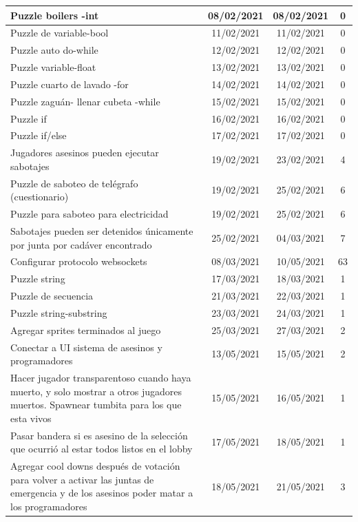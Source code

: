 \begin{longtable}[c]{|m{5cm}|c|c|c|}
        Puzzle boilers -int & 08/02/2021 & 08/02/2021 & 0 \\ \hline
        Puzzle de variable-bool & 11/02/2021 & 11/02/2021 & 0 \\ \hline
        Puzzle auto do-while & 12/02/2021 & 12/02/2021 & 0 \\ \hline
        Puzzle variable-float & 13/02/2021 & 13/02/2021 & 0 \\ \hline
        Puzzle cuarto de lavado -for & 14/02/2021 & 14/02/2021 & 0 \\ \hline
        Puzzle zaguán- llenar cubeta -while & 15/02/2021 & 15/02/2021 & 0 \\ \hline
        Puzzle if & 16/02/2021 & 16/02/2021 & 0 \\ \hline
        Puzzle if/else & 17/02/2021 & 17/02/2021 & 0 \\ \hline
        Jugadores asesinos pueden ejecutar sabotajes & 19/02/2021 & 23/02/2021 & 4 \\ \hline
        Puzzle de saboteo de telégrafo (cuestionario) & 19/02/2021 & 25/02/2021 & 6 \\ \hline
        Puzzle para saboteo para electricidad & 19/02/2021 & 25/02/2021 & 6 \\ \hline
        Sabotajes pueden ser detenidos únicamente por junta por cadáver encontrado & 25/02/2021 & 04/03/2021 & 7 \\ \hline
        Configurar protocolo websockets & 08/03/2021 & 10/05/2021 & 63 \\ \hline
        Puzzle string & 17/03/2021 & 18/03/2021 & 1 \\ \hline
        Puzzle de secuencia & 21/03/2021 & 22/03/2021 & 1 \\ \hline
        Puzzle string-substring & 23/03/2021 & 24/03/2021 & 1 \\ \hline
        Agregar sprites terminados al juego & 25/03/2021 & 27/03/2021 & 2 \\ \hline
        Conectar a UI sistema de asesinos y programadores & 13/05/2021 & 15/05/2021 & 2 \\ \hline
        Hacer jugador transparentoso cuando haya muerto, y solo mostrar a otros jugadores muertos. Spawnear tumbita para los que esta vivos & 15/05/2021 & 16/05/2021 & 1 \\ \hline
        Pasar bandera si es asesino de la selección que ocurrió al estar todos listos en el lobby & 17/05/2021 & 18/05/2021 & 1 \\ \hline
        Agregar cool downs después de votación para volver a activar las juntas de emergencia y de los asesinos poder matar a los programadores & 18/05/2021 & 21/05/2021 & 3 \\ \hline

\end{longtable}
